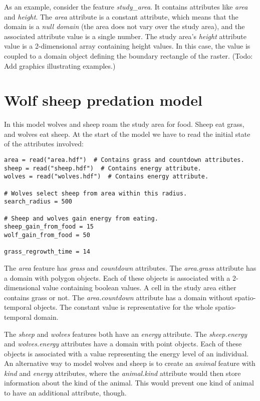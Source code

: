 \documentclass[10pt, a4paper]{article}
\begin{document}
As an example, consider the feature \emph{study\_area}. It contains attributes like \emph{area} and \emph{height}. The \emph{area} attribute is a constant attribute, which means that the domain is a \emph{null domain} (the area does not vary over the study area), and the associated attribute value is a single number. The study area's \emph{height} attribute value is a 2-dimensional array containing height values. In this case, the value is coupled to a domain object defining the boundary rectangle of the raster. (Todo: Add graphics illustrating examples.)

\section{Wolf sheep predation model}
In this model wolves and sheep roam the study area for food. Sheep eat grass, and wolves eat sheep. At the start of the model we have to read the initial state of the attributes involved:

\begin{lstlisting}
area = read("area.hdf")  # Contains grass and countdown attributes.
sheep = read("sheep.hdf")  # Contains energy attribute.
wolves = read("wolves.hdf")  # Contains energy attribute.

# Wolves select sheep from area within this radius.
search_radius = 500

# Sheep and wolves gain energy from eating.
sheep_gain_from_food = 15
wolf_gain_from_food = 50

grass_regrowth_time = 14
\end{lstlisting}

The \emph{area} feature has \emph{grass} and \emph{countdown} attributes. The \emph{area.grass} attribute has a domain with polygon objects. Each of these objects is associated with a 2-dimensional value containing boolean values. A cell in the study area either contains grass or not. The \emph{area.countdown} attribute has a domain without spatio-temporal objects. The constant value is representative for the whole spatio-temporal domain.

The \emph{sheep} and \emph{wolves} features both have an \emph{energy} attribute. The \emph{sheep.energy} and \emph{wolves.energy} attributes have a domain with point objects. Each of these objects is associated with a value representing the energy level of an individual. An alternative way to model wolves and sheep is to create an \emph{animal} feature with \emph{kind} and \emph{energy} attributes, where the \emph{animal.kind} attribute would then store information about the kind of the animal. This would prevent one kind of animal to have an additional attribute, though.
\end{document}
